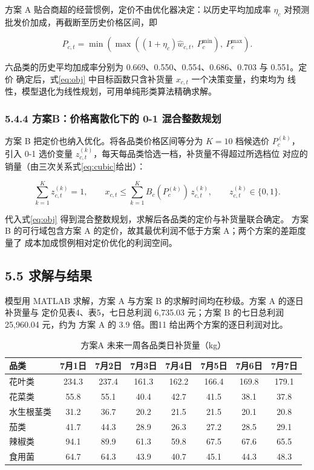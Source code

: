 方案 A 贴合商超的经营惯例，定价不由优化器决定：以历史平均加成率 $\eta_c$ 对预测
批发价加成，再截断至历史价格区间，即

\begin{equation}
P_{c,t}=\min\left(\max\left((1+\eta_c)\hat w_{c,t},\ P_c^{\min}\right),\ P_c^{\max}\right).
\label{eq:markup}
\end{equation}

六品类的历史平均加成率分别为 0.669、0.550、0.554、0.686、0.703 与 0.551。定价
确定后，式\eqref{eq:obj} 中目标函数只含补货量 $x_{c,t}$ 一个决策变量，约束均为
线性，模型退化为线性规划，可用单纯形类算法精确求解。

\subsubsection{5.4.4 方案B：价格离散化下的 0-1 混合整数规划}

方案 B 把定价也纳入优化。将各品类价格区间等分为 $K=10$ 档候选价 $P_c^{(k)}$，
引入 0-1 选价变量 $z_{c,t}^{(k)}$，每天每品类恰选一档，补货量不得超过所选档位
对应的销量（由三次关系式\eqref{eq:cubic}给出）：

\begin{equation}
\sum_{k=1}^{K}z_{c,t}^{(k)}=1,\qquad
x_{c,t}\le\sum_{k=1}^{K}B_c(P_c^{(k)})\,z_{c,t}^{(k)},\qquad z_{c,t}^{(k)}\in\{0,1\}.
\label{eq:milp}
\end{equation}

代入式\eqref{eq:obj} 得到混合整数规划，求解后各品类的定价与补货量联合确定。
方案 B 的可行域包含方案 A 的定价，故其最优利润不低于方案 A；两个方案的差距度量了
成本加成惯例相对定价优化的利润空间。

\subsection{5.5 求解与结果}

模型用 MATLAB 求解，方案 A 与方案 B 的求解时间均在秒级。方案 A 的逐日补货量与
定价见表4、表5，七日总利润 6,735.03 元；方案 B 的七日总利润 25,960.04 元，约为
方案 A 的 3.9 倍。图11 给出两个方案的逐日利润对比。

\begin{table}[H]
\centering
\caption{方案A 未来一周各品类日补货量（kg）}
\label{tab:q2xA}
\small
\begin{tabular}{lccccccc}
\toprule
品类 & 7月1日 & 7月2日 & 7月3日 & 7月4日 & 7月5日 & 7月6日 & 7月7日 \\
\midrule
花叶类 & 234.3 & 237.4 & 161.3 & 162.2 & 166.4 & 169.8 & 179.1 \\
花菜类 & 55.8 & 55.1 & 40.4 & 42.7 & 41.5 & 38.1 & 37.8 \\
水生根茎类 & 31.2 & 36.7 & 20.2 & 21.5 & 21.5 & 20.1 & 20.8 \\
茄类 & 41.7 & 44.3 & 28.9 & 26.3 & 27.2 & 28.5 & 29.1 \\
辣椒类 & 94.1 & 89.9 & 61.3 & 59.8 & 67.5 & 67.6 & 65.5 \\
食用菌 & 64.7 & 64.3 & 43.9 & 40.7 & 45.1 & 44.3 & 48.3 \\
\bottomrule
\end{tabular}
\end{table}

